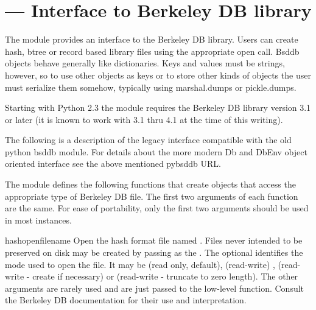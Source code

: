 \section{ ---
         Interface to Berkeley DB library}



The  module provides an interface to the Berkeley DB
library.  Users can create hash, btree or record based library files
using the appropriate open call. Bsddb objects behave generally like
dictionaries.  Keys and values must be strings, however, so to use
other objects as keys or to store other kinds of objects the user must
serialize them somehow, typically using marshal.dumps or pickle.dumps.

Starting with Python 2.3 the  module requires the
Berkeley DB library version 3.1 or later (it is known to work with 3.1
thru 4.1 at the time of this writing).

\begin{seealso}
\end{seealso}

The following is a description of the legacy  interface
compatible with the old python bsddb module.  For details about the more
modern Db and DbEnv object oriented interface see the above mentioned
pybsddb URL.

The  module defines the following functions that create
objects that access the appropriate type of Berkeley DB file.  The
first two arguments of each function are the same.  For ease of
portability, only the first two arguments should be used in most
instances.

\begin{funcdesc}{hashopen}{filename}
Open the hash format file named .  Files never intended
to be preserved on disk may be created by passing  as the 
.  The optional
 identifies the mode used to open the file.  It may be
 (read only, default),  (read-write) ,
 (read-write - create if necessary) or
 (read-write - truncate to zero length).  The other
arguments are rarely used and are just passed to the low-level
 function.  Consult the Berkeley DB documentation
for their use and interpretation.
\end{funcdesc}

